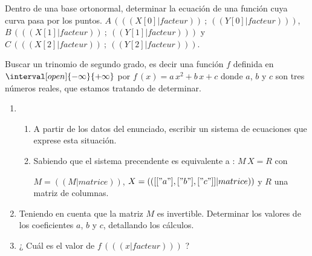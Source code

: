 \exercice
Dentro de una base ortonormal, determinar la ecuación de una función cuya curva pasa por los puntos.
$A\,( (( X[0]|facteur )) ~;~ (( Y[0]|facteur )) )$,
$B\,( (( X[1]|facteur )) ~;~ (( Y[1]|facteur )) )$ y
$C\,( (( X[2]|facteur )) ~;~ (( Y[2]|facteur )) )$.

Buscar un trinomio de segundo grado, es decir una función $f$ definida en $\interval[open]{-\infty}{+\infty}$ por
 \mbox{$f\,(x) = a\,x^2 + b\,x + c$} donde $a$, $b$ y $c$ son tres números reales, que estamos tratando de determinar.

  \begin{enumerate}
    \item 
      \begin{enumerate}
        \item A partir de los datos del enunciado, escribir un sistema de ecuaciones que exprese esta situación.
        \item Sabiendo que el sistema precendente es equivalente a : $M\,X = R$ con

          $M = (( M|matrice ))$, $X= (( [["a"], ["b"], ["c"]]|matrice ))$ y $R$ una matriz de columnas.
      \end{enumerate}
  \end{enumerate}
  \begin{enumerate}
      \setcounter{enumi}{1}
    \item Teniendo en cuenta que la matriz $M$ es invertible.
      Determinar los valores de los coeficientes $a$, $b$ y $c$, detallando los cálculos.
    \item ¿ Cuál es el valor de $f\,( (( x|facteur )) )$ ?

  \end{enumerate}
